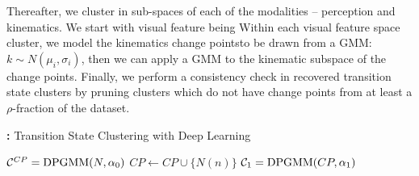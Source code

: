 \documentclass[0-main.tex]{subfiles}
\begin{document}
Thereafter, we cluster in sub-spaces of each of the modalities -- perception and kinematics. We start with visual feature being 
Within each visual feature space cluster, we model the kinematics change pointsto be drawn from a GMM:
$k \sim N(\mu_i, \sigma_i)$, 
then we can apply a GMM to the kinematic subspace of the change points. Finally, we perform a consistency check in recovered transition state clusters by pruning clusters which do not have change points from at least a $\rho$-fraction of the dataset.



\begin{algorithm}[t]
\small
\DontPrintSemicolon
\caption{\textbf{\TSC:} Transition State Clustering with Deep Learning \label{alg:vtsc}}
{\small {}}
    {\scriptsize  {}}
    $\mathcal{C}^{CP} = \textnormal{DPGMM}(N, \alpha_0)$ {\scriptsize  {}}
     {$CP \gets CP \cup \{N(n)\}$}
    {\scriptsize  {}}
    $\mathcal{C}_{1} = \textnormal{DPGMM}(CP, \alpha_1)$ {\scriptsize  {}}

\end{algorithm}
\end{document}
